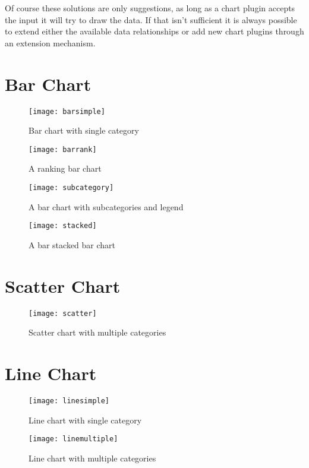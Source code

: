 Of course these solutions are only suggestions, as long as a chart plugin accepts the input it will try to draw the data. If that isn't sufficient it is always possible to extend either the available data relationships or add new chart plugins through an extension mechanism.

\section{Bar Chart}
\begin{figure}[H]
	\centering
	\texttt{[image: barsimple]}
	\caption{Bar chart with single category}
\end{figure}

\begin{figure}[H]
	\centering
	\texttt{[image: barrank]}
	\caption{A ranking bar chart}
\end{figure}

\begin{figure}[H]
	\centering
	\texttt{[image: subcategory]}
	\caption{A bar chart with subcategories and legend}
\end{figure}

\begin{figure}[H]
	\centering
	\texttt{[image: stacked]}
	\caption{A bar stacked bar chart}
\end{figure}

\section{Scatter Chart}
\begin{figure}[H]
	\centering
	\texttt{[image: scatter]}
	\caption{Scatter chart with multiple categories}
\end{figure}

\section{Line Chart}
\begin{figure}[H]
\centering
\texttt{[image: linesimple]}
\caption{Line chart with single category}
\end{figure}

\begin{figure}[H]
\centering
\texttt{[image: linemultiple]}
\caption{Line chart with multiple categories}
\end{figure}

